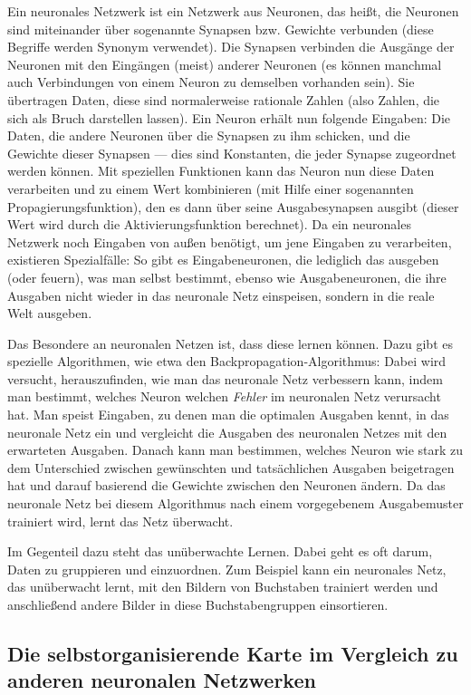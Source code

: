 \documentclass[twoside,a4paper,draft]{article}
\begin{document}
\begin{multicols}{2}
Ein neuronales Netzwerk ist ein Netzwerk aus Neuronen, das heißt, die Neuronen sind miteinander über sogenannte Synapsen bzw. Gewichte verbunden (diese Begriffe werden Synonym verwendet). Die Synapsen verbinden die Ausgänge der Neuronen mit den Eingängen (meist) anderer Neuronen (es können manchmal auch Verbindungen von einem Neuron zu demselben vorhanden sein). Sie übertragen Daten, diese sind normalerweise rationale Zahlen (also Zahlen, die sich als Bruch darstellen lassen). Ein Neuron erhält nun folgende Eingaben: Die Daten, die andere Neuronen über die Synapsen zu ihm schicken, und die \glqq{}Gewichte\grqq{} dieser Synapsen --- dies sind Konstanten, die jeder Synapse zugeordnet werden können. Mit speziellen Funktionen kann das Neuron nun diese Daten verarbeiten und zu einem Wert kombinieren (mit Hilfe einer sogenannten Propagierungsfunktion), den es dann über seine Ausgabesynapsen ausgibt (dieser Wert wird durch die Aktivierungsfunktion berechnet). Da ein neuronales Netzwerk noch Eingaben von außen benötigt, um jene Eingaben zu verarbeiten, existieren Spezialfälle: So gibt es Eingabeneuronen, die lediglich das ausgeben (oder \glqq{}feuern\grqq{}), was man selbst bestimmt, ebenso wie Ausgabeneuronen, die ihre Ausgaben nicht wieder in das neuronale Netz einspeisen, sondern in die reale Welt ausgeben.

Das Besondere an neuronalen Netzen ist, dass diese lernen können. Dazu gibt es spezielle Algorithmen, wie etwa den Backpropagation-Algorithmus: Dabei wird versucht, herauszufinden, wie man das neuronale Netz verbessern kann, indem man bestimmt, welches Neuron welchen \emph{Fehler} im neuronalen Netz verursacht hat. Man speist Eingaben, zu denen man die optimalen Ausgaben kennt, in das neuronale Netz ein und vergleicht die Ausgaben des neuronalen Netzes mit den erwarteten Ausgaben. Danach kann man bestimmen, welches Neuron wie stark zu dem Unterschied zwischen gewünschten und tatsächlichen Ausgaben beigetragen hat und darauf basierend die Gewichte zwischen den Neuronen ändern. Da das neuronale Netz bei diesem Algorithmus nach einem vorgegebenem Ausgabemuster trainiert wird, lernt das Netz \glqq{}überwacht\grqq{}. 

Im Gegenteil dazu steht das unüberwachte Lernen. Dabei geht es oft darum, Daten zu gruppieren und einzuordnen. Zum Beispiel kann ein neuronales Netz, das unüberwacht lernt, mit den Bildern von Buchstaben trainiert werden und anschließend andere Bilder in diese Buchstabengruppen einsortieren.

\subsection{Die selbstorganisierende Karte im Vergleich zu anderen neuronalen Netzwerken}


\end{multicols}
\end{document}
